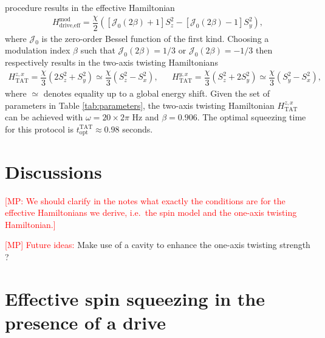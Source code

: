 \documentclass[aps,notitlepage,nofootinbib,11pt]{revtex4-1}
\renewcommand{\t}{\text} %
\newcommand{\f}[2]{\dfrac{#1}{#2}} %
\newcommand{\p}[1]{\left(#1\right)} %
\renewcommand{\sp}[1]{\left[#1\right]} %
\newcommand{\J}{\mathcal{J}}
\newcommand{\1}{\hat{\mathds{1}}}
\newcommand{\note}[1]{\textcolor{red}{#1}}
\begin{document}
procedure results in the effective Hamiltonian
\begin{align}
  H_{\t{drive,eff}}^{\t{mod}}
  = \f{\chi}{2} \p{\sp{\J_0\p{2\beta}+1} S_z^2
    - \sp{\J_0\p{2\beta}-1} S_y^2},
\end{align}
where $\J_0$ is the zero-order Bessel function of the first kind.
Choosing a modulation index $\beta$ such that $\J_0\p{2\beta}=1/3$ or
$\J_0\p{2\beta}=-1/3$ then respectively results in the two-axis
twisting Hamiltonians
\begin{align}
  H_{\t{TAT}}^{z,x}
  = \f{\chi}{3} \p{2 S_z^2 + S_y^2}
  \simeq \f{\chi}{3} \p{S_z^2 - S_x^2},
  &&
  H_{\t{TAT}}^{y,x}
  = \f{\chi}{3} \p{S_z^2 + 2 S_y^2}
  \simeq \f{\chi}{3}\p{S_y^2 - S_x^2},
  \label{eq:H_TAT_drive}
\end{align}
where $\simeq$ denotes equality up to a global energy shift. Given the
set of parameters in Table \ref{tab:parameters}, the two-axis twisting
Hamiltonian $H_{\t{TAT}}^{z,x}$ can be achieved with
$\omega=20\times2\pi$ Hz and $\beta=0.906$.  The optimal squeezing
time for this protocol is $t_{\t{opt}}^{\t{TAT}}\approx0.98$ seconds.


\section{Discussions}

\note{[MP: We should clarify in the notes what exactly the conditions
  are for the effective Hamiltonians we derive, i.e.~the spin model
  and the one-axis twisting Hamiltonian.]}

\note{[MP] Future ideas:} Make use of a cavity to enhance the one-axis
twisting strength \cite{hu2017vacuum}?


\appendix

\section{Effective spin squeezing in the presence of a drive}
\label{sec:effective_squeezing_drive}
\end{document}
